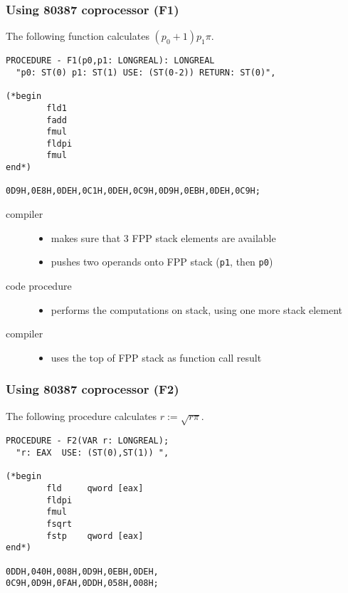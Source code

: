 \subsubsection{Using 80387 coprocessor (F1)}

The following function calculates $(p_0+1)p_1\pi$.

\begin{verbatim}
PROCEDURE - F1(p0,p1: LONGREAL): LONGREAL
  "p0: ST(0) p1: ST(1) USE: (ST(0-2)) RETURN: ST(0)",

(*begin
        fld1
        fadd
        fmul
        fldpi
        fmul
end*)

0D9H,0E8H,0DEH,0C1H,0DEH,0C9H,0D9H,0EBH,0DEH,0C9H;
\end{verbatim}

\begin{description}
\item[compiler] \mbox{}
   \begin{itemize}
     \item makes sure that 3 FPP stack elements are available
     \item pushes two operands onto FPP stack ({\tt p1}, then {\tt p0})
   \end{itemize}
\item[code procedure] \mbox{}
   \begin{itemize}
   \item performs the computations on stack, using one more stack element
   \end{itemize}
\item[compiler] \mbox{}
   \begin{itemize}
   \item  uses the top of FPP stack as function call result
   \end{itemize}
\end{description}

\subsubsection{Using 80387 coprocessor (F2)}

The following procedure calculates $r:=\sqrt{r\pi}$.

\begin{verbatim}
PROCEDURE - F2(VAR r: LONGREAL);
  "r: EAX  USE: (ST(0),ST(1)) ",

(*begin
        fld     qword [eax]
        fldpi
        fmul
        fsqrt
        fstp    qword [eax]
end*)

0DDH,040H,008H,0D9H,0EBH,0DEH,
0C9H,0D9H,0FAH,0DDH,058H,008H;
\end{verbatim}


